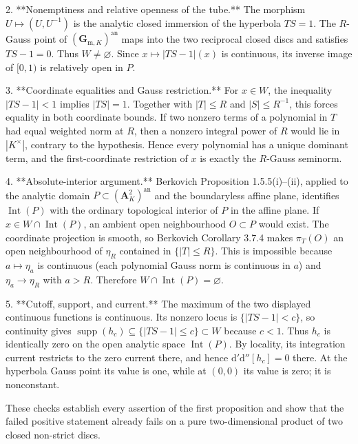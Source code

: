 2. **Nonemptiness and relative openness of the tube.** The morphism
   \(U\mapsto(U,U^{-1})\) is the analytic closed immersion of the hyperbola
   \(TS=1\). The \(R\)-Gauss point of
   \((\mathbf G_{\mathrm m,K})^{\mathrm{an}}\) maps into the two reciprocal
   closed discs and satisfies \(TS-1=0\). Thus \(W\ne\varnothing\). Since
   \(x\mapsto|TS-1|(x)\) is continuous, its inverse image of \([0,1)\) is
   relatively open in \(P\).

3. **Coordinate equalities and Gauss restriction.** For \(x\in W\), the
   inequality \(|TS-1|<1\) implies \(|TS|=1\). Together with
   \(|T|\leq R\) and \(|S|\leq R^{-1}\), this forces equality in both
   coordinate bounds. If two nonzero terms of a polynomial in \(T\) had
   equal weighted norm at \(R\), then a nonzero integral power of \(R\)
   would lie in \(|K^\times|\), contrary to the hypothesis. Hence every
   polynomial has a unique dominant term, and the first-coordinate
   restriction of \(x\) is exactly the \(R\)-Gauss seminorm.

4. **Absolute-interior argument.** Berkovich Proposition 1.5.5(i)--(ii),
   applied to the analytic domain
   \(P\subset(\mathbf A^2_K)^{\mathrm{an}}\) and the boundaryless affine
   plane, identifies \(\operatorname{Int}(P)\) with the ordinary
   topological interior of \(P\) in the affine plane. If
   \(x\in W\cap\operatorname{Int}(P)\), an ambient open neighbourhood
   \(O\subset P\) would exist. The coordinate projection is smooth, so
   Berkovich Corollary 3.7.4 makes \(\pi_T(O)\) an open neighbourhood of
   \(\eta_R\) contained in \(\{|T|\leq R\}\). This is impossible because
   \(a\mapsto\eta_a\) is continuous (each polynomial Gauss norm is
   continuous in \(a\)) and \(\eta_a\to\eta_R\) with \(a>R\). Therefore
   \(W\cap\operatorname{Int}(P)=\varnothing\).

5. **Cutoff, support, and current.** The maximum of the two displayed
   continuous functions is continuous. Its nonzero locus is
   \(\{|TS-1|<c\}\), so continuity gives
   \(\operatorname{supp}(h_c)\subseteq\{|TS-1|\leq c\}\subset W\) because
   \(c<1\). Thus \(h_c\) is identically zero on the open analytic space
   \(\operatorname{Int}(P)\). By locality, its integration current
   restricts to the zero current there, and hence
   \(\mathrm d'\mathrm d''[h_c]=0\) there. At the hyperbola Gauss point its
   value is one, while at \((0,0)\) its value is zero; it is nonconstant.

These checks establish every assertion of the first proposition and show
that the failed positive statement already fails on a pure two-dimensional
product of two closed non-strict discs.

